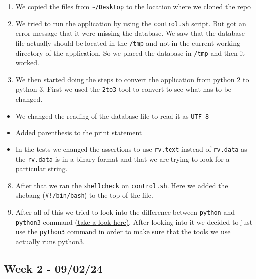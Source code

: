 \begin{enumerate}
    \def\labelenumi{\arabic{enumi}.}
    \setcounter{enumi}{4}
    \item We copied the files from \texttt{\textasciitilde{}/Desktop} to the location where we cloned the repo
    \item We tried to run the application by using the \texttt{control.sh} script. But got an error message that it were missing the database. We saw that the database file actually should be located in the \texttt{/tmp} and not in the current working directory of the application. So we placed the database in \texttt{/tmp} and then it worked.
    \item We then started doing the steps to convert the application from python 2 to python 3. First we used the \texttt{2to3} tool to convert to see what has to be changed.
\end{enumerate}

\begin{itemize}
    \item We changed the reading of the database file to read it as \texttt{UTF-8}
    \item Added parenthesis to the print statement
    \item In the tests we changed the assertions to use \texttt{rv.text} instead of \texttt{rv.data} as the \texttt{rv.data} is in a binary format and that we are trying to look for a particular string.
\end{itemize}

\begin{enumerate}
\setcounter{enumi}{7}
    \item After that we ran the \texttt{shellcheck} on \texttt{control.sh}. Here we added the shebang (\texttt{\#!/bin/bash}) to the top of the file.
    \item After all of this we tried to look into the difference between \texttt{python} and \texttt{python3} command \href{https://stackoverflow.com/questions/64801225/python-or-python3-what-is-the-difference}{(take a look here)}. After looking into it we decided to just use the \texttt{python3} command in order to make sure that the tools we use actually runs python3.
\end{enumerate}

\subsection{Week 2 - 09/02/24}
\label{log:week2}

